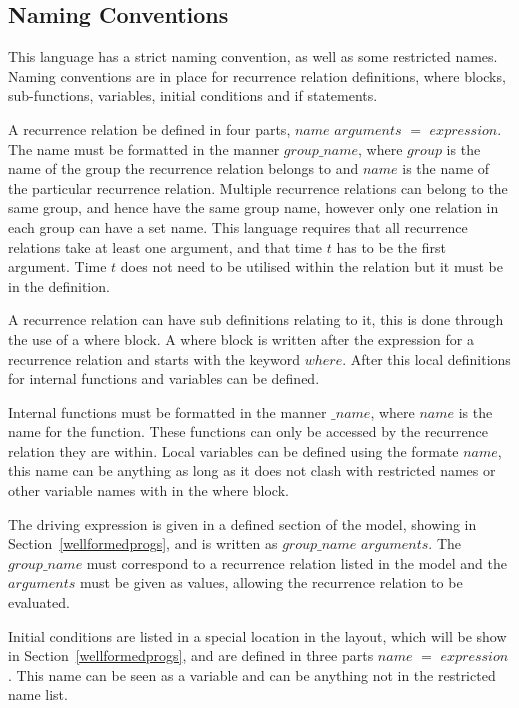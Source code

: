 \documentclass{article}
\begin{document}
\subsection{Naming Conventions} \label{nameconv}
This language has a strict naming convention, as well as some restricted names. Naming conventions are in place for recurrence relation definitions, where blocks, sub-functions, variables, initial conditions and  if statements. 

A recurrence relation be defined in four parts, $name$ $arguments$ $=$ $expression$. The name must be formatted in the manner $group\_name$, where $group$ is the name of the group the recurrence relation belongs to and $name$ is the name of the particular recurrence relation. Multiple recurrence relations can belong to the same group, and hence have the same group name, however only one relation in each group can have a set name. This language requires that all recurrence relations take at least one argument, and that time $t$ has to be the first argument. Time $t$ does not need to be utilised within the relation but it must be in the definition.     

A recurrence relation can have sub definitions relating to it, this is done through the use of a where block. A where block is written after the expression for a recurrence relation and starts with the keyword $where$. After this local definitions for internal functions and variables can be defined. 

Internal functions must be formatted in the manner $\_name$, where $name$ is the name for the function. These functions can only be accessed by the recurrence relation they are within. Local variables can be defined using the formate $name$, this name can be anything as long as it does not clash with restricted names or other variable names with in the where block. 

The driving expression is given in a defined section of the model, showing in Section~\ref{wellformedprogs}, and is written as  $group\_name$ $arguments$. The  $group\_name$ must correspond to a recurrence relation listed in the model and the $arguments$ must be given as values, allowing the recurrence relation to be evaluated. 

Initial conditions are listed in a special location in the layout, which will be show in Section~\ref{wellformedprogs}, and are defined in three parts $name$ $=$ $expression$. This name can be seen as a variable and can be anything not in the restricted name list. 
\end{document}
